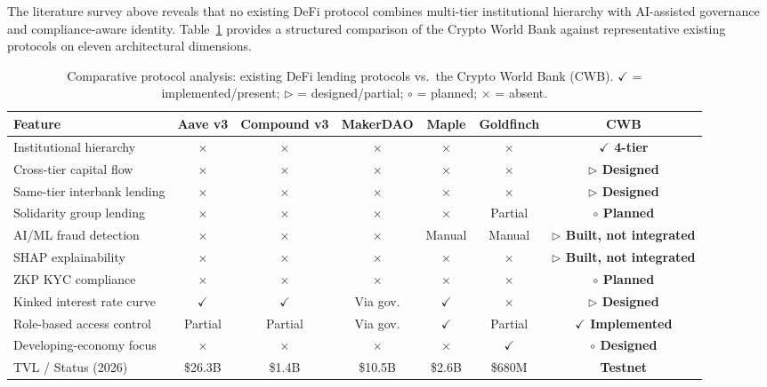 \documentclass[12pt,a4paper]{report}
\newcommand{\tmarkDone}{\textcolor{green!55!black}{$\checkmark$}}
\newcommand{\tmarkNo}{\textcolor{red!75!black}{$\times$}}
\newcommand{\tmarkPartial}{\textcolor{orange!85!black}{$\triangleright$}}
\newcommand{\tmarkPlanned}{\textcolor{blue!75!black}{$\circ$}}
\newcommand{\tableheadcolor}{\rowcolor{PrimaryBlue!12}}
\newcommand{\tableheadfont}{\bfseries\small\color{PrimaryBlue}}
\begin{document}
The literature survey above reveals that no existing DeFi protocol combines multi-tier institutional hierarchy with AI-assisted governance and compliance-aware identity. Table~\ref{tab:protocol-comparison} provides a structured comparison of the Crypto World Bank against representative existing protocols on eleven architectural dimensions.

\begin{table}[H]
\centering
\setlength{\tabcolsep}{5pt}
\caption{Comparative protocol analysis: existing DeFi lending protocols vs.\ the Crypto World Bank (CWB). {\normalfont \tmarkDone{} = implemented/present; \tmarkPartial{} = designed/partial; \tmarkPlanned{} = planned; \tmarkNo{} = absent.}}
\label{tab:protocol-comparison}
\renewcommand{\arraystretch}{1.25}
\small
\begin{tabular}{@{}p{4.2cm}ccccc>{\bfseries}c@{}}
\toprule
\tableheadcolor
\tableheadfont Feature & \tableheadfont Aave v3 & \tableheadfont Compound v3 & \tableheadfont MakerDAO & \tableheadfont Maple & \tableheadfont Goldfinch & \tableheadfont CWB \\
\midrule
Institutional hierarchy & \tmarkNo{} & \tmarkNo{} & \tmarkNo{} & \tmarkNo{} & \tmarkNo{} & \tmarkDone{} 4-tier \\
\rowcolor{RowShade}
Cross-tier capital flow & \tmarkNo{} & \tmarkNo{} & \tmarkNo{} & \tmarkNo{} & \tmarkNo{} & \tmarkPartial{} Designed \\
Same-tier interbank lending & \tmarkNo{} & \tmarkNo{} & \tmarkNo{} & \tmarkNo{} & \tmarkNo{} & \tmarkPartial{} Designed \\
\rowcolor{RowShade}
Solidarity group lending & \tmarkNo{} & \tmarkNo{} & \tmarkNo{} & \tmarkNo{} & Partial & \tmarkPlanned{} Planned \\
AI/ML fraud detection & \tmarkNo{} & \tmarkNo{} & \tmarkNo{} & Manual & Manual & \tmarkPartial{} Built, not integrated \\
\rowcolor{RowShade}
SHAP explainability & \tmarkNo{} & \tmarkNo{} & \tmarkNo{} & \tmarkNo{} & \tmarkNo{} & \tmarkPartial{} Built, not integrated \\
ZKP KYC compliance & \tmarkNo{} & \tmarkNo{} & \tmarkNo{} & \tmarkNo{} & \tmarkNo{} & \tmarkPlanned{} Planned \\
\rowcolor{RowShade}
Kinked interest rate curve & \tmarkDone{} & \tmarkDone{} & Via gov. & \tmarkDone{} & \tmarkNo{} & \tmarkPartial{} Designed \\
Role-based access control & Partial & Partial & Via gov. & \tmarkDone{} & Partial & \tmarkDone{} Implemented \\
\rowcolor{RowShade}
Developing-economy focus & \tmarkNo{} & \tmarkNo{} & \tmarkNo{} & \tmarkNo{} & \tmarkDone{} & \tmarkPlanned{} Designed \\
TVL / Status (2026) & \$26.3B & \$1.4B & \$10.5B & \$2.6B & \$680M & Testnet \\
\bottomrule
\end{tabular}
\end{table}
\end{document}
